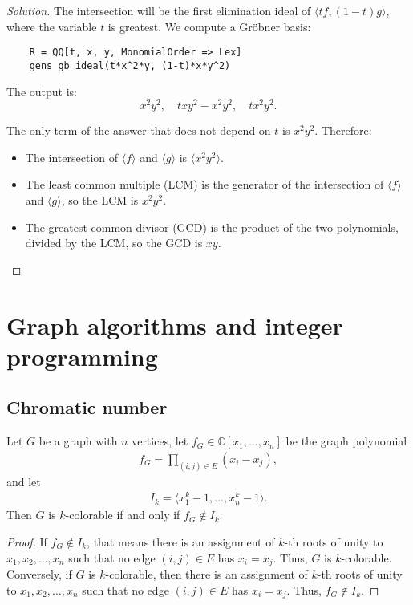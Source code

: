 \documentclass[12pt]{article}
\newcounter{algorithm}
\newenvironment{solution}
    {\renewcommand{\qedsymbol}{}\begin{proof}[Solution]}
    {\end{proof}}
\begin{document}
\begin{solution}
	The intersection will be the first elimination ideal of \( \langle tf, (1-t)g \rangle \), where the variable \( t \) is greatest. We compute a Gr\"obner basis:
	\begin{verbatim}
    R = QQ[t, x, y, MonomialOrder => Lex]
    gens gb ideal(t*x^2*y, (1-t)*x*y^2)
    \end{verbatim}

	The output is:
	\[
		x^2y^2, \quad txy^2 - x^2y^2, \quad tx^2y^2.
	\]

	The only term of the answer that does not depend on \( t \) is \( x^2y^2 \). Therefore:
	\begin{itemize}
		\item The intersection of \( \langle f \rangle \) and \( \langle g \rangle \) is \( \langle x^2y^2 \rangle \).
		\item The least common multiple (LCM) is the generator of the intersection of \( \langle f \rangle \) and \( \langle g \rangle \), so the LCM is \( x^2y^2 \).
		\item The greatest common divisor (GCD) is the product of the two polynomials, divided by the LCM, so the GCD is \( xy \).
	\end{itemize}
\end{solution}

%
\section{Graph algorithms and integer programming}
\subsection{Chromatic number}

\begin{theorem}
	Let \(G\) be a graph with \(n\) vertices, let \(f_G \in \mathbb{C}[x_1, \ldots, x_n]\) be the graph polynomial
	\begin{align*}
		f_G = \prod_{(i, j) \in E} (x_i - x_j),
	\end{align*} and let
	\begin{align*}
		I_k = \langle x_1^k - 1, \ldots, x_n^k - 1 \rangle.
	\end{align*}
	Then \(G\) is \(k\)-colorable if and only if \(f_G \notin I_k\).
\end{theorem}

\begin{proof}
	If \(f_G \not\in I_k\), that means there is an assignment of \(k\)-th roots of unity to \(x_1, x_2, \ldots, x_n\) such that no edge \((i, j) \in E\) has \(x_i = x_j\). Thus, \(G\) is \(k\)-colorable. Conversely, if \(G\) is \(k\)-colorable, then there is an assignment of \(k\)-th roots of unity to \(x_1, x_2, \ldots, x_n\) such that no edge \((i, j) \in E\) has \(x_i = x_j\). Thus, \(f_G \not\in I_k\).
\end{proof}
\end{document}
